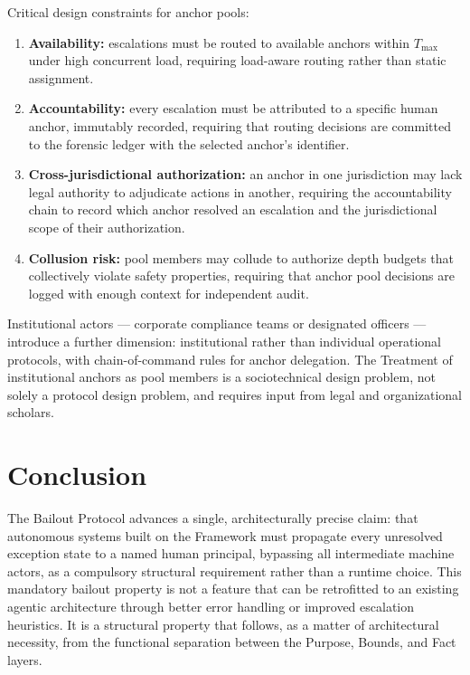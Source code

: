 Critical design constraints for anchor pools:

\begin{enumerate}
  \item[(i)] \textbf{Availability:} escalations must be routed to available anchors within $T_{\max}$ under high concurrent load, requiring load-aware routing rather than static assignment.
  \item[(ii)] \textbf{Accountability:} every escalation must be attributed to a specific human anchor, immutably recorded, requiring that routing decisions are committed to the forensic ledger with the selected anchor's identifier.
  \item[(iii)] \textbf{Cross-jurisdictional authorization:} an anchor in one jurisdiction may lack legal authority to adjudicate actions in another, requiring the accountability chain to record which anchor resolved an escalation and the jurisdictional scope of their authorization.
  \item[(iv)] \textbf{Collusion risk:} pool members may collude to authorize depth budgets that collectively violate safety properties, requiring that anchor pool decisions are logged with enough context for independent audit.
\end{enumerate}

Institutional actors --- corporate compliance teams or designated officers --- introduce a further dimension: institutional rather than individual operational protocols, with chain-of-command rules for anchor delegation. The Treatment of institutional anchors as pool members is a sociotechnical design problem, not solely a protocol design problem, and requires input from legal and organizational scholars.

\section{Conclusion}
\label{sec:conclusion}

The Bailout Protocol advances a single, architecturally precise claim: that autonomous systems built on the \bxthree{} Framework must propagate every unresolved exception state to a named human principal, bypassing all intermediate machine actors, as a compulsory structural requirement rather than a runtime choice. This mandatory bailout property is not a feature that can be retrofitted to an existing agentic architecture through better error handling or improved escalation heuristics. It is a structural property that follows, as a matter of architectural necessity, from the functional separation between the Purpose, Bounds, and Fact layers.

